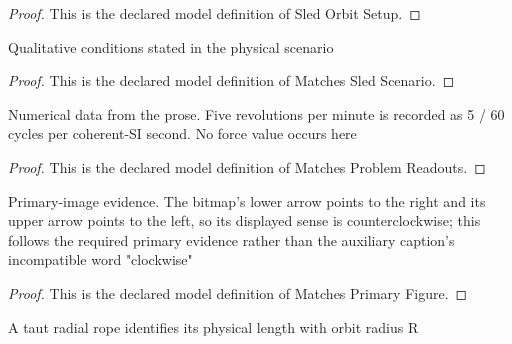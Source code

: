 \begin{proof}
  This is the declared model definition of Sled Orbit Setup.
\end{proof}
\begin{definition}
  \label{def:physics:phyx-mini-0806:phyxminiproblems-problemphyxmini0806-matchessledscenario}
  Qualitative conditions stated in the physical scenario
\end{definition}
\begin{proof}
  This is the declared model definition of Matches Sled Scenario.
\end{proof}
\begin{definition}
  \label{def:physics:phyx-mini-0806:phyxminiproblems-problemphyxmini0806-matchesproblemreadouts}
  Numerical data from the prose. Five revolutions per minute is recorded as 5 / 60 cycles per coherent-SI second. No force value occurs here
\end{definition}
\begin{proof}
  This is the declared model definition of Matches Problem Readouts.
\end{proof}
\begin{definition}
  \label{def:physics:phyx-mini-0806:phyxminiproblems-problemphyxmini0806-matchesprimaryfigure}
  Primary-image evidence. The bitmap's lower arrow points to the right and its upper arrow points to the left, so its displayed sense is counterclockwise; this follows the required primary evidence rather than the auxiliary caption's incompatible word "clockwise"
\end{definition}
\begin{proof}
  This is the declared model definition of Matches Primary Figure.
\end{proof}
\begin{definition}
  \label{def:physics:phyx-mini-0806:phyxminiproblems-problemphyxmini0806-satisfiestautropegeometry}
  A taut radial rope identifies its physical length with orbit radius R
\end{definition}
